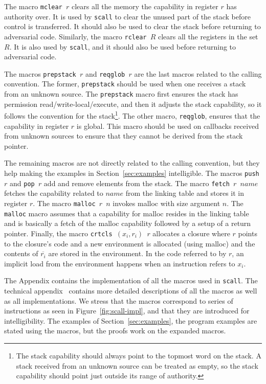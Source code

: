 \documentclass[format=acmsmall, review=true, screen=true]{acmart}
\renewcommand{\figurename}{Figure}
\renewcommand{\sectionname}{Section}
\newcommand{\var}[1]{\mathit{#1}}
\newenvironment{toplas}%
    {\color{OliveGreen}}{}
\newcommand{\itoplassug}[1]{}
\begin{document}
\begin{toplas}
The macro \texttt{mclear $r$} clears all the memory the
capability in register $r$ has authority over. It is used by \texttt{scall} to
clear the unused part of the stack before control is transferred. It should also
be used to clear the stack before returning to adversarial code. Similarly, the
macro \texttt{rclear $R$} clears all the registers in the set
$R$. It is also used by \texttt{scall}, and it should also be used before
returning to adversarial code.

The macros \texttt{prepstack $r$} and \texttt{reqglob
    $r$} are the last macros related to the calling convention. The former,
\texttt{prepstack} should be used when one receives a stack from an unknown
source. The \texttt{prepstack} macro first ensures the stack has permission
read/write-local/execute, and then it adjusts the stack capability, so it
follows the convention for the stack\footnote{The stack capability should always
point to the topmost word on the stack. A stack received from an unknown source
can be treated as empty, so the stack capability should point just outside its
range of authority.}. The other macro, \texttt{reqglob}, ensures that the
capability in register $r$ is global. This macro should be used on callbacks
received from unknown sources to ensure that they cannot be derived from the
stack pointer.

The remaining macros are not directly related to the calling convention, but
they help making the examples in \sectionname~\ref{sec:examples} intelligible.
The macros \texttt{push $r$} and \texttt{pop $r$}
add and remove elements from the stack. The macro \texttt{fetch
    $r$ $\var{name}$} fetches the capability related to $\var{name}$ from the
linking table and stores it in register $r$. The macro
\texttt{malloc $r$ $n$} invokes malloc with size argument $n$.
The \texttt{malloc} macro assumes that a capability for malloc resides in the
linking table and is basically a fetch of the malloc capability followed by a
setup of a return pointer. Finally, the macro \texttt{crtcls
    $\overline{(x_i,r_i)}$ $r$} allocates a closure where $r$ points to the
closure's code and a new environment is allocated (using malloc) and the
contents of $\overline{r_i}$ are stored in the environment. In the code referred
to by $r$, an implicit load from the environment happens when an instruction
refers to $x_i$.

The Appendix contains the implementation of all the macros used in
\texttt{scall}. The technical appendix~\citep{technical_appendix} contains more
detailed descriptions of all the macros as well as all implementations.
We stress that the macros correspond to series of instructions as seen in
\figurename~\ref{fig:scall-impl}, and that they
are introduced for intelligibility. The examples of
\sectionname~\ref{sec:examples}, the program examples are stated using the
macros, but the proofs work on the expanded macros.
\end{toplas}
\end{document}
